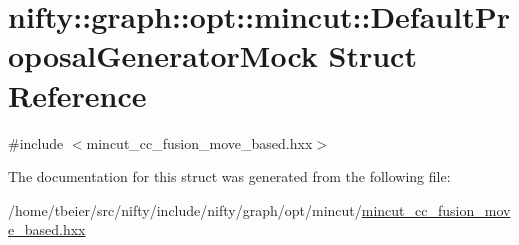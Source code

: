 \hypertarget{structnifty_1_1graph_1_1opt_1_1mincut_1_1DefaultProposalGeneratorMock}{}\section{nifty\+:\+:graph\+:\+:opt\+:\+:mincut\+:\+:Default\+Proposal\+Generator\+Mock Struct Reference}
\label{structnifty_1_1graph_1_1opt_1_1mincut_1_1DefaultProposalGeneratorMock}


{\ttfamily \#include $<$mincut\+\_\+cc\+\_\+fusion\+\_\+move\+\_\+based.\+hxx$>$}



The documentation for this struct was generated from the following file\+:\begin{DoxyCompactItemize}
\item 
/home/tbeier/src/nifty/include/nifty/graph/opt/mincut/\hyperlink{mincut__cc__fusion__move__based_8hxx}{mincut\+\_\+cc\+\_\+fusion\+\_\+move\+\_\+based.\+hxx}\end{DoxyCompactItemize}
